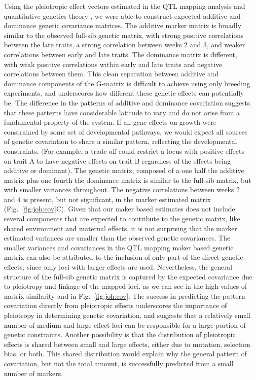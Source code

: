 \begin{refsection}
Using the pleiotropic effect vectors estimated in the QTL mapping analysis and
quantitative genetics theory \parencite{Kelly2009-bj}, we were able to
construct expected additive and dominance genetic covariance matrices. The
additive marker matrix is broadly similar to the observed full-sib genetic
matrix, with strong positive correlations between the late traits, a strong
correlation between weeks 2 and 3, and weaker correlations between early and
late traits. The dominance matrix is different, with weak positive
correlations within early and late traits and negative correlations between
them. This clean separation between additive and dominance components of the
G-matrix is difficult to achieve using only breeding experiments, and
underscores how different these genetic effects can potentially be. The
difference in the patterns of additive and dominance covariation suggests that
these patterns have considerable latitude to vary and do not arise from a
fundamental property of the system. If all gene effects on growth were
constrained by some set of developmental pathways, we would expect all sources
of genetic covariation to share a similar pattern, reflecting the
developmental constraints. (For example, a trade-off could restrict a locus
with positive effects on trait A to have negative effects on trait B
regardless of the effects being additive or dominant). The genetic matrix,
composed of a one half the additive matrix plus one fourth the dominance
matrix is similar to the full-sib matrix, but with smaller variances
throughout. The negative correlations between weeks 2 and 4 is present, but
not significant, in the marker estimated matrix (Fig.~\ref{fig:joh:cov}C).
Given that our maker based estimates does not include several components that
are expected to contribute to the genetic matrix, like shared environment and
maternal effects, it is not surprising that the marker estimated variances are
smaller than the observed genetic covariances. The smaller variances and
covariances in the QTL mapping maker based genetic matrix can also be
attributed to the inclusion of only part of the direct genetic effects, since
only loci with larger effects are used. Nevertheless, the general structure of
the full-sib genetic matrix is captured by the expected covariance due to
pleiotropy and linkage of the mapped loci, as we can see in the high values of
matrix similarity and in Fig.~\ref{fig:joh:cov}. The success in predicting the
pattern covariation directly from pleiotropic effects underscores the
importance of pleiotropy in determining genetic covariation, and suggests that
a relatively small number of medium and large effect loci can be responsible
for a large portion of genetic constraints. Another possibility is that the
distribution of pleiotropic effects is shared between small and large effects,
either due to mutation, selection bias, or both. This shared distribution
would explain why the general pattern of covariation, but not the total
amount, is successfully predicted from a small number of markers.


\end{refsection}
